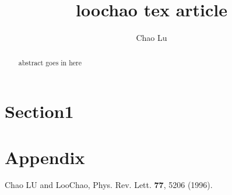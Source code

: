 \documentclass[preprint,preprintnumbers]{revtex4}
\begin{document}
\title{ loochao tex article }
\author{Chao Lu}

\begin{abstract}
abstract goes in here
\end{abstract}

\maketitle

\section{Section1}

\appendix

\section{Appendix}

\begin{thebibliography}{99}
 Chao LU and LooChao, Phys. Rev. Lett. \textbf{77},
  5206 (1996).
\end{thebibliography}
\end{document}
